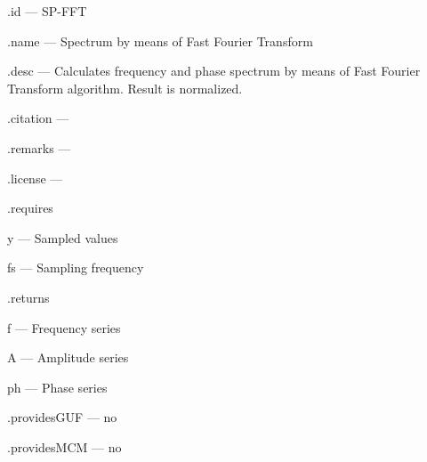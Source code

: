 \begin{tightdesc}
\item [\textsf{.id}] --- SP-FFT
\item [\textsf{.name}] --- Spectrum by means of Fast Fourier Transform
\item [\textsf{.desc}] --- Calculates frequency and phase spectrum by means of Fast Fourier Transform algorithm. Result is normalized.
\item [\textsf{.citation}] --- 
\item [\textsf{.remarks}] --- 
\item [\textsf{.license}] --- 
\item [\textsf{.requires}] \rule{0em}{0em}
\begin{tightdesc}
\item [\textsf{y}] --- Sampled values
\item [\textsf{fs}] --- Sampling frequency
\end{tightdesc}
\item [\textsf{.returns}] \rule{0em}{0em}
\begin{tightdesc}
\item [\textsf{f}] --- Frequency series
\item [\textsf{A}] --- Amplitude series
\item [\textsf{ph}] --- Phase series
\end{tightdesc}
\item [\textsf{.providesGUF}] --- no
\item [\textsf{.providesMCM}] ---  no
\end{tightdesc}
